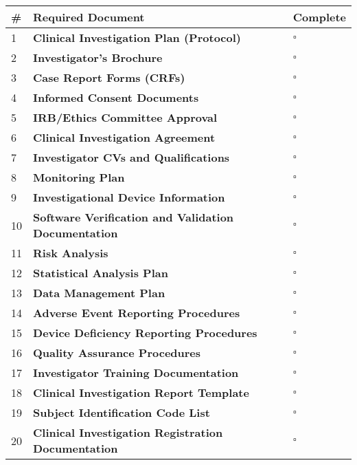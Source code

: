\begin{tcolorbox}[title=Essential Documentation for Clinical Investigation of Digital Health Applications]
\begin{tabular}{|p{1cm}|p{12cm}|p{1cm}|}
\hline
\textbf{\#} & \textbf{Required Document} & \textbf{Complete} \\
\hline
1 & \textbf{Clinical Investigation Plan (Protocol)} & $\square$ \\
\hline
2 & \textbf{Investigator's Brochure} & $\square$ \\
\hline
3 & \textbf{Case Report Forms (CRFs)} & $\square$ \\
\hline
4 & \textbf{Informed Consent Documents} & $\square$ \\
\hline
5 & \textbf{IRB/Ethics Committee Approval} & $\square$ \\
\hline
6 & \textbf{Clinical Investigation Agreement} & $\square$ \\
\hline
7 & \textbf{Investigator CVs and Qualifications} & $\square$ \\
\hline
8 & \textbf{Monitoring Plan} & $\square$ \\
\hline
9 & \textbf{Investigational Device Information} & $\square$ \\
\hline
10 & \textbf{Software Verification and Validation Documentation} & $\square$ \\
\hline
11 & \textbf{Risk Analysis} & $\square$ \\
\hline
12 & \textbf{Statistical Analysis Plan} & $\square$ \\
\hline
13 & \textbf{Data Management Plan} & $\square$ \\
\hline
14 & \textbf{Adverse Event Reporting Procedures} & $\square$ \\
\hline
15 & \textbf{Device Deficiency Reporting Procedures} & $\square$ \\
\hline
16 & \textbf{Quality Assurance Procedures} & $\square$ \\
\hline
17 & \textbf{Investigator Training Documentation} & $\square$ \\
\hline
18 & \textbf{Clinical Investigation Report Template} & $\square$ \\
\hline
19 & \textbf{Subject Identification Code List} & $\square$ \\
\hline
20 & \textbf{Clinical Investigation Registration Documentation} & $\square$ \\
\hline
\end{tabular}
\end{tcolorbox}

